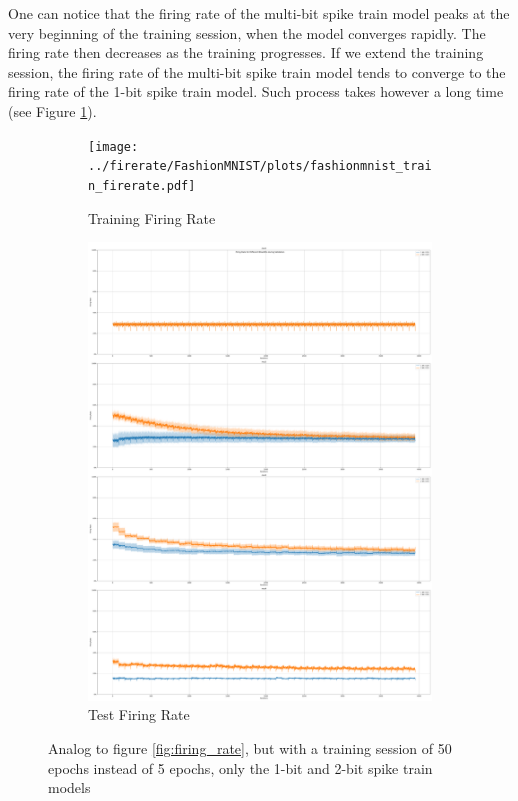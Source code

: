     One can notice that the firing rate of the multi-bit spike train model peaks at the very beginning of the training session, when the model converges rapidly. The firing rate then decreases as the training progresses. If we extend the training session, the firing rate of the multi-bit spike train model tends to converge to the firing rate of the 1-bit spike train model. Such process takes however a long time (see Figure \ref{fig:long_firing_rate}). 
    \begin{figure}[!htpb]
        \centering
        \begin{subfigure}[H]{0.48\textwidth}
            \centering
            \texttt{[image: ../firerate/FashionMNIST/plots/fashionmnist\_train\_firerate.pdf]}
            \caption{Training Firing Rate}
        \end{subfigure}
        \hfill
        \begin{subfigure}[H]{0.48\textwidth}
            \centering
            \includegraphics[width=\textwidth]{../firerate/FashionMNIST/plots/fashionmnist_test_firerate.pdf}
            \caption{Test Firing Rate}
        \end{subfigure}
        \caption{Analog to figure \ref{fig:firing_rate}, but with a training session of 50 epochs instead of 5 epochs, only the 1-bit and 2-bit spike train models}
        \label{fig:long_firing_rate}
    \end{figure}

